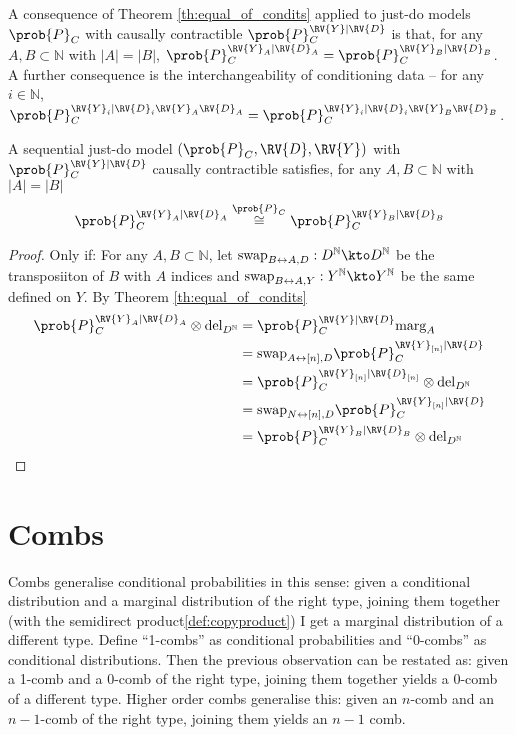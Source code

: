 A consequence of Theorem \ref{th:equal_of_condits} applied to just-do models $\prob{P}_C$ with causally contractible $\prob{P}_C^{\RV{Y}|\RV{D}}$ is that, for any $A,B\subset\mathbb{N}$ with $|A|=|B|$, $\prob{P}_C^{\RV{Y}_A|\RV{D}_A}=\prob{P}_C^{\RV{Y}_B|\RV{D}_B}$. A further consequence is the interchangeability of conditioning data -- for any $i\in \mathbb{N}$, $\prob{P}_C^{\RV{Y}_i|\RV{D}_i\RV{Y}_A\RV{D}_A}=\prob{P}_C^{\RV{Y}_i|\RV{D}_i\RV{Y}_B\RV{D}_B}$.

\begin{theorem}\label{th:equal_of_reduced_condits}
A sequential just-do model $(\prob{P}_C,\RV{D},\RV{Y})$ with $\prob{P}_C^{\RV{Y}|\RV{D}}$ causally contractible satisfies, for any $A,B\subset \mathbb{N}$ with $|A|=|B|$
\begin{align}
    \prob{P}_C^{\RV{Y}_A|\RV{D}_A} \overset{\prob{P}_C}{\cong} \prob{P}_C^{\RV{Y}_B|\RV{D}_B}
\end{align}
\end{theorem}

\begin{proof}
Only if:
For any $A,B\subset \mathbb{N}$, let $\text{swap}_{B\leftrightarrow A,D}:D^{\mathbb{N}}\kto D^{\mathbb{N}}$ be the transposiiton of $B$ with $A$ indices and $\text{swap}_{B\leftrightarrow A,Y}:Y^{\mathbb{N}}\kto Y^{\mathbb{N}}$ be the same defined on $Y$. By Theorem \ref{th:equal_of_condits}
\begin{align}
    \prob{P}_C^{\RV{Y}_A|\RV{D}_A}\otimes \text{del}_{D^{\mathbb{N}}} &=  \prob{P}_C^{\RV{Y}|\RV{D}} \text{marg}_A\\
     &= \text{swap}_{A\leftrightarrow[n],D} \prob{P}_C^{\RV{Y}_{[n]}|\RV{D}}\\
    &= \prob{P}_C^{\RV{Y}_{[n]}|\RV{D}_{[n]}}\otimes \text{del}_{D^{\mathbb{N}}}\\
    &= \text{swap}_{N\leftrightarrow[n],D} \prob{P}_C^{\RV{Y}_{[n]}|\RV{D}}\\
    &= \prob{P}_C^{\RV{Y}_B|\RV{D}_B}\otimes \text{del}_{D^{\mathbb{N}}}
\end{align}
\end{proof}

\section{Combs}\label{sec:def_combs}


Combs generalise conditional probabilities in this sense: given a conditional distribution and a marginal distribution of the right type, joining them together (with the semidirect product\ref{def:copyproduct}) I get a marginal distribution of a different type. Define ``1-combs'' as conditional probabilities and ``0-combs'' as conditional distributions. Then the previous observation can be restated as: given a 1-comb and a 0-comb of the right type,  joining them together yields a 0-comb of a different type. Higher order combs generalise this: given an $n$-comb and an $n-1$-comb of the right type, joining them yields an $n-1$ comb.

